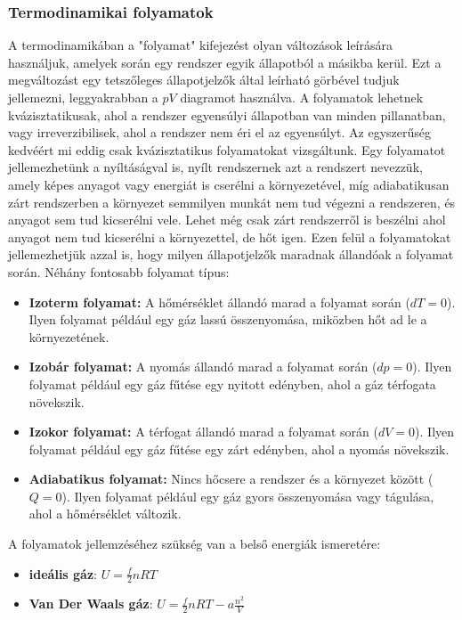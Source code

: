 \documentclass[a4paper,12pt]{article}
\begin{document}
\subsubsection{Termodinamikai folyamatok}
A termodinamikában a "folyamat" kifejezést olyan változások leírására használjuk, amelyek során egy rendszer egyik állapotból a másikba kerül. Ezt a megváltozást
egy tetszőleges állapotjelzők által leírható görbével tudjuk jellemezni, leggyakrabban a $pV$ diagramot használva. A folyamatok lehetnek kvázisztatikusak, ahol a rendszer egyensúlyi állapotban van minden pillanatban, vagy irreverzibilisek, ahol a rendszer nem éri el az egyensúlyt.
Az egyszerűség kedvéért mi eddig csak kvázisztatikus folyamatokat vizsgáltunk. Egy folyamatot jellemezhetünk a nyíltáságval is, nyílt rendszernek azt a rendszert nevezzük, amely képes anyagot vagy energiát is cserélni a környezetével, míg adiabatikusan zárt rendszerben a környezet semmilyen munkát nem tud végezni a rendszeren, és anyagot sem tud kicserélni vele.
Lehet még csak zárt rendszerről is beszélni ahol anyagot nem tud kicserélni a környezettel, de hőt igen.
Ezen felül a folyamatokat jellemezhetjük azzal is, hogy milyen állapotjelzők maradnak állandóak a folyamat során. Néhány fontosabb folyamat típus:
\begin{itemize}
    \item \textbf{Izoterm folyamat:} A hőmérséklet állandó marad a folyamat során ($dT = 0$). Ilyen folyamat például egy gáz lassú összenyomása, miközben hőt ad le a környezetének.
    \item \textbf{Izobár folyamat:} A nyomás állandó marad a folyamat során ($dp = 0$). Ilyen folyamat például egy gáz fűtése egy nyitott edényben, ahol a gáz térfogata növekszik.
    \item \textbf{Izokor folyamat:} A térfogat állandó marad a folyamat során ($dV = 0$). Ilyen folyamat például egy gáz fűtése egy zárt edényben, ahol a nyomás növekszik.
    \item \textbf{Adiabatikus folyamat:} Nincs hőcsere a rendszer és a környezet között ($Q = 0$). Ilyen folyamat például egy gáz gyors összenyomása vagy tágulása, ahol a hőmérséklet változik.
\end{itemize}
A folyamatok jellemzéséhez szükség van a belső energiák ismeretére:
\begin{itemize}
    \item \textbf{ideális gáz}: $U = \frac{f}{2} n R T$
    \item \textbf{Van Der Waals gáz}: $U = \frac{f}{2} n R T - a \frac{n^2}{V}$
\end{itemize}
\end{document}
